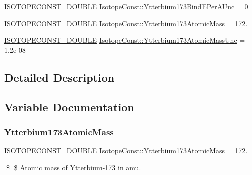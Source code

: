 \begin{DoxyCompactItemize}
\mbox{\hyperlink{group___isotope_const-_macros_ga8f45a7272ce02c0b4c65c44636ed719a}{I\+S\+O\+T\+O\+P\+E\+C\+O\+N\+S\+T\+\_\+\+D\+O\+U\+B\+LE}} \mbox{\hyperlink{group___isotope_const-_ytterbium-_yb173_gab1eae946f7ce210f0cb4a15890cfadf8}{Isotope\+Const\+::\+Ytterbium173\+Bind\+E\+Per\+A\+Unc}} = 0
\item 
\mbox{\hyperlink{group___isotope_const-_macros_ga8f45a7272ce02c0b4c65c44636ed719a}{I\+S\+O\+T\+O\+P\+E\+C\+O\+N\+S\+T\+\_\+\+D\+O\+U\+B\+LE}} \mbox{\hyperlink{group___isotope_const-_ytterbium-_yb173_ga28c0b907da81b0b87f3b2d0d202e54b1}{Isotope\+Const\+::\+Ytterbium173\+Atomic\+Mass}} = 172.
\item 
\mbox{\hyperlink{group___isotope_const-_macros_ga8f45a7272ce02c0b4c65c44636ed719a}{I\+S\+O\+T\+O\+P\+E\+C\+O\+N\+S\+T\+\_\+\+D\+O\+U\+B\+LE}} \mbox{\hyperlink{group___isotope_const-_ytterbium-_yb173_gaf7c0119be7f510b9dd78dbd0519405f8}{Isotope\+Const\+::\+Ytterbium173\+Atomic\+Mass\+Unc}} = 1.\+2e-\/08
\end{DoxyCompactItemize}


\subsection{Detailed Description}


\subsection{Variable Documentation}
\mbox{\label{group___isotope_const-_ytterbium-_yb173_ga28c0b907da81b0b87f3b2d0d202e54b1}} 
\subsubsection{\texorpdfstring{Ytterbium173\+Atomic\+Mass}{Ytterbium173AtomicMass}}
{\footnotesize\ttfamily \mbox{\hyperlink{group___isotope_const-_macros_ga8f45a7272ce02c0b4c65c44636ed719a}{I\+S\+O\+T\+O\+P\+E\+C\+O\+N\+S\+T\+\_\+\+D\+O\+U\+B\+LE}} Isotope\+Const\+::\+Ytterbium173\+Atomic\+Mass = 172.}

\$ \$ Atomic mass of Ytterbium-\/173 in amu. \mbox{\label{group___isotope_const-_ytterbium-_yb173_gaf7c0119be7f510b9dd78dbd0519405f8}} 

